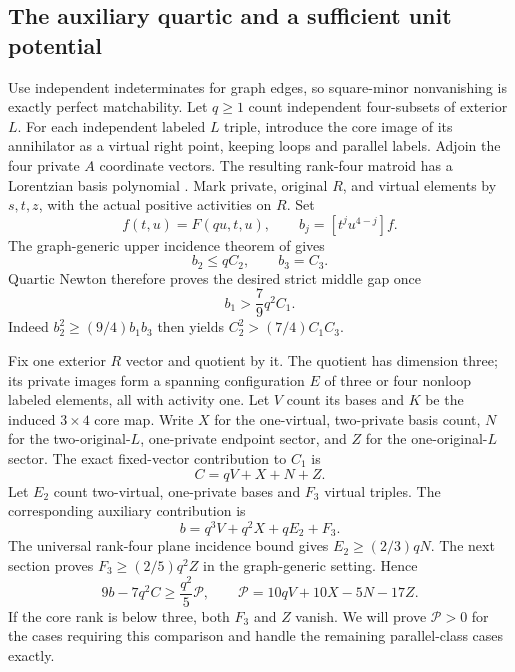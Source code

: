 \documentclass[11pt,a4paper]{article}
\theoremstyle{remark}\newtheorem{remark}[theorem]{Remark}
\begin{document}
\subsection{The auxiliary quartic and a sufficient unit potential}
Use independent indeterminates for graph edges, so square-minor nonvanishing is exactly perfect matchability. Let $q\ge1$ count independent four-subsets of exterior $L$. For each independent labeled $L$ triple, introduce the core image of its annihilator as a virtual right point, keeping loops and parallel labels. Adjoin the four private $A$ coordinate vectors. The resulting rank-four matroid has a Lorentzian basis polynomial \cite{b:BH}. Mark private, original $R$, and virtual elements by $s,t,z$, with the actual positive activities on $R$. Set
\[
 f(t,u)=F(qu,t,u),\qquad b_j=[t^ju^{4-j}]f.
\]
The graph-generic upper incidence theorem of \cite{b:m02} gives
\begin{equation}\label{mrn:e:r8:eq:auxupper}
 b_2\le qC_2,\qquad b_3=C_3.
\end{equation}
Quartic Newton therefore proves the desired strict middle gap once
\begin{equation}\label{mrn:e:r8:eq:suffices}
 b_1>\frac79q^2C_1.
\end{equation}
Indeed $b_2^2\ge(9/4)b_1b_3$ then yields $C_2^2>(7/4)C_1C_3$.

Fix one exterior $R$ vector and quotient by it. The quotient has dimension three; its private images form a spanning configuration $E$ of three or four nonloop labeled elements, all with activity one. Let $V$ count its bases and $K$ be the induced $3\times4$ core map. Write $X$ for the one-virtual, two-private basis count, $N$ for the two-original-$L$, one-private endpoint sector, and $Z$ for the one-original-$L$ sector. The exact fixed-vector contribution to $C_1$ is
\[
 C=qV+X+N+Z.
\]
Let $E_2$ count two-virtual, one-private bases and $F_3$ virtual triples. The corresponding auxiliary contribution is
\[
 b=q^3V+q^2X+qE_2+F_3.
\]
The universal rank-four plane incidence bound gives $E_2\ge(2/3)qN$. The next section proves $F_3\ge(2/5)q^2Z$ in the graph-generic setting. Hence
\begin{equation}\label{mrn:e:r8:eq:potential}
 9b-7q^2C\ge\frac{q^2}{5}\mathcal P,
 \qquad \mathcal P=10qV+10X-5N-17Z.
\end{equation}
If the core rank is below three, both $F_3$ and $Z$ vanish. We will prove $\mathcal P>0$ for the cases requiring this comparison and handle the remaining parallel-class cases exactly.
\end{document}
